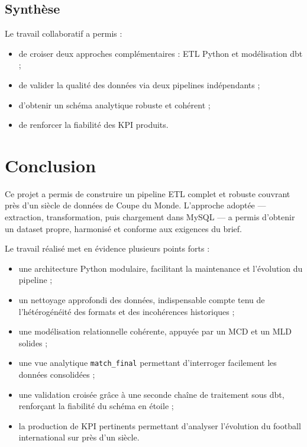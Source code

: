 \documentclass[12pt,a4paper]{article}
\begin{document}
\subsection*{Synthèse}

Le travail collaboratif a permis :

\begin{itemize}
    \item de croiser deux approches complémentaires : ETL Python et modélisation dbt ;
    \item de valider la qualité des données via deux pipelines indépendants ;
    \item d’obtenir un schéma analytique robuste et cohérent ;
    \item de renforcer la fiabilité des KPI produits.
\end{itemize}

\newpage
\section{Conclusion}

Ce projet a permis de construire un pipeline ETL complet et robuste couvrant près d’un siècle de données de Coupe du Monde.  
L’approche adoptée — extraction, transformation, puis chargement dans MySQL — a permis d’obtenir un dataset propre, harmonisé et conforme aux exigences du brief.

Le travail réalisé met en évidence plusieurs points forts :

\begin{itemize}
    \item une architecture Python modulaire, facilitant la maintenance et l’évolution du pipeline ;
    \item un nettoyage approfondi des données, indispensable compte tenu de l’hétérogénéité des formats et des incohérences historiques ;
    \item une modélisation relationnelle cohérente, appuyée par un MCD et un MLD solides ;
    \item une vue analytique \texttt{match\_final} permettant d’interroger facilement les données consolidées ;
    \item une validation croisée grâce à une seconde chaîne de traitement sous dbt, renforçant la fiabilité du schéma en étoile ;
    \item la production de KPI pertinents permettant d’analyser l’évolution du football international sur près d’un siècle.
\end{itemize}
\end{document}
